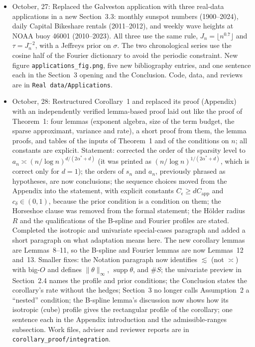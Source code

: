\documentclass[11pt]{article}
\begin{document}
\begin{itemize}
    \item October, 27: Replaced the Galveston application with three real-data applications in a new Section~3.3: monthly sunspot numbers (1900--2024), daily Capital Bikeshare rentals (2011--2012), and weekly wave heights at NOAA buoy 46001 (2010--2023). All three use the same rule, $J_n=\lfloor n^{0.7}\rfloor$ and $\tau=J_n^{-2}$, with a Jeffreys prior on $\sigma$. The two chronological series use the cosine half of the Fourier dictionary to avoid the periodic constraint. New figure \texttt{applications\_fig.png}, five new bibliography entries, and one sentence each in the Section~3 opening and the Conclusion. Code, data, and reviews are in \texttt{Real data/Applications}.

    \item October, 28: Restructured Corollary~1 and replaced its proof (Appendix) with an independently verified lemma-based proof laid out like the proof of Theorem~1: four lemmas (exponent algebra, size of the term budget, the sparse approximant, variance and rate), a short proof from them, the lemma proofs, and tables of the inputs of Theorem~1 and of the conditions on $n$; all constants are explicit. Statement: corrected the order of the sparsity level to $a_n\asymp(n/\log n)^{d/(2\alpha^*+d)}$ (it was printed as $(n/\log n)^{1/(2\alpha^*+d)}$, which is correct only for $d=1$); the orders of $s_n$ and $a_n$, previously phrased as hypotheses, are now conclusions; the sequence choices moved from the Appendix into the statement, with explicit constants $C_\epsilon\geq dC_{\mathrm{app}}$ and $c_\delta\in(0,1)$, because the prior condition is a condition on them; the Horseshoe clause was removed from the formal statement; the H\"older radius $R$ and the qualifications of the B-spline and Fourier profiles are stated. Completed the isotropic and univariate special-cases paragraph and added a short paragraph on what adaptation means here. The new corollary lemmas are Lemmas~8--11, so the B-spline and Fourier lemmas are now Lemmas~12 and~13. Smaller fixes: the Notation paragraph now identifies $\lesssim$ (not $\asymp$) with big-$O$ and defines $\|\theta\|_\infty$, $\operatorname{supp}\theta$, and $\#S$; the univariate preview in Section~2.4 names the profile and prior conditions; the Conclusion states the corollary's rate without the hedges; Section~3 no longer calls Assumption~2 a ``nested'' condition; the B-spline lemma's discussion now shows how its isotropic (cube) profile gives the rectangular profile of the corollary; one sentence each in the Appendix introduction and the admissible-ranges subsection. Work files, adviser and reviewer reports are in \texttt{corollary\_proof/integration}.


\end{itemize}
\end{document}
